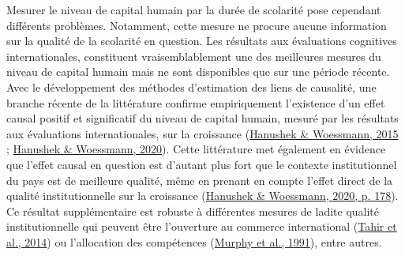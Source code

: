 \documentclass[
]{book}
\begin{document}
\quad Mesurer le niveau de capital humain par la durée de scolarité pose cependant différents problèmes. Notamment, cette mesure ne procure aucune information sur la qualité de la scolarité en question. Les résultats aux évaluations cognitives internationales, constituent vraisemblablement une des meilleures mesures du niveau de capital humain mais ne sont disponibles que sur une période récente. Avec le développement des méthodes d'estimation des liens de causalité, une branche récente de la littérature confirme empiriquement l'existence d'un effet causal positif et significatif du niveau de capital humain, mesuré par les résultats aux évaluations internationales, sur la croissance (\protect\hyperlink{ref-HAN:WOE:15}{Hanushek \& Woessmann, 2015} ; \protect\hyperlink{ref-HAN:WOE:20}{Hanushek \& Woessmann, 2020}). Cette littérature met également en évidence que l'effet causal en question est d'autant plus fort que le contexte institutionnel du pays est de meilleure qualité, même en prenant en compte l'effet direct de la qualité institutionnelle sur la croissance (\protect\hyperlink{ref-HAN:WOE:20}{Hanushek \& Woessmann, 2020, p. 178}). Ce résultat supplémentaire est robuste à différentes mesures de ladite qualité institutionnelle qui peuvent être l'ouverture au commerce international (\protect\hyperlink{ref-TAH:eal:14}{Tahir et al., 2014}) ou l'allocation des compétences (\protect\hyperlink{ref-MUR:eal:91}{Murphy et al., 1991}), entre autres.
\end{document}
